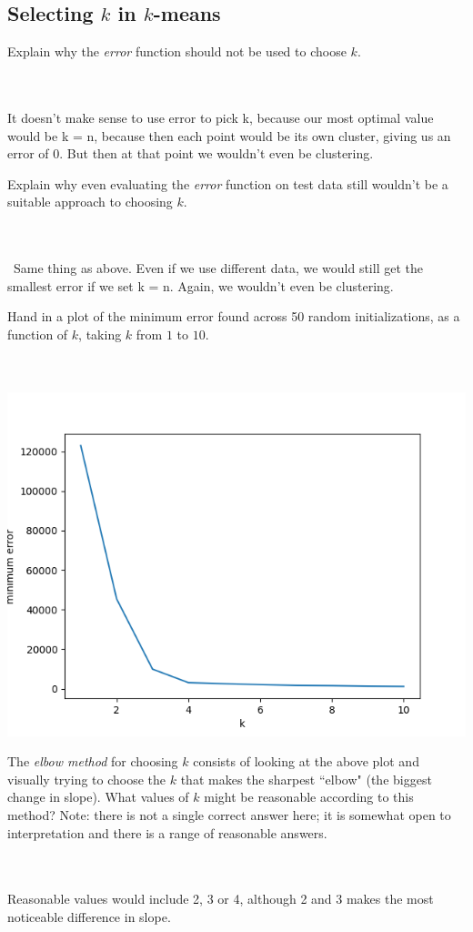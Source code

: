 \documentclass{article}
\def\blu#1{{\color{blu}#1}}
\def\enum#1{\begin{enumerate}#1\end{enumerate}}
\begin{document}
\subsection{Selecting $k$ in $k$-means}

 \enum{
 \blu{\item Explain why the \emph{error} function should not be used to choose $k$.} \\\\ It doesn't make sense to use error to pick k, because our most optimal value would be k = n, because then each point would be its own cluster, giving us an error of 0. But then at that point we wouldn't even be clustering.
 \blu{\item Explain why even evaluating the \emph{error} function on test data still wouldn't be a suitable approach to choosing $k$.} \\\\\ Same thing as above. Even if we use different data, we would still get the smallest error if we set k = n. Again, we wouldn't even be clustering.
 \blu{\item Hand in a plot of the minimum error found across 50 random initializations, as a function of $k$, taking $k$ from $1$ to $10$.} \\\\ \includegraphics{../figs/kmeans_3_2}
 \blu{\item The \emph{elbow method} for choosing $k$ consists of looking at the above plot and visually trying to choose the $k$ that makes the sharpest ``elbow" (the biggest change in slope). What values of $k$ might be reasonable according to this method? Note: there is not a single correct answer here; it is somewhat open to interpretation and there is a range of reasonable answers.} \\\\ Reasonable values would include 2, 3 or 4, although 2 and 3 makes the most noticeable difference in slope.
}
\end{document}
